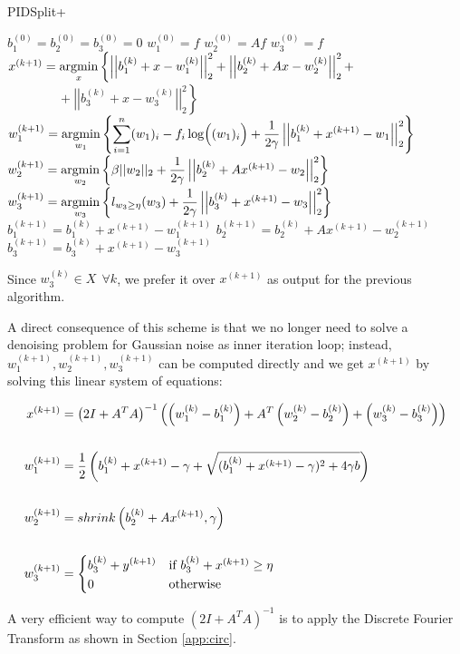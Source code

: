 \begin{algorithm}[H]
\caption{PIDSplit+}
\begin{algorithmic}
\STATE $b_1^{(0)} = b_2^{(0)} = b_3^{(0)} = 0$
\STATE $w_1^{(0)} = f$
\STATE $w_2^{(0)} = Af$
\STATE $w_3^{(0)} = f$
\STATE $x^{(k+1)} = \mathop{\mathrm{argmin}}\limits_x \left\{ \left|\left|b_1^{(k)}+x-w_1^{(k)}\right|\right|_2^2 + \left|\left|b_2^{(k)} + Ax -w_2^{(k)}\right|\right|_2^2 + \right.$
\STATE $\left. \qquad\qquad + \left|\left|b_3^{(k)}+x-w_3^{(k)}\right|\right|_2^2 \right\}$
\STATE
\STATE $w_1^{(k+1)} = \mathop{\mathrm{argmin}}\limits_{w_1} \left\{ \displaystyle \sum_{i=1}^n (w_1)_i - f_i \log\Bigl((w_1)_i\Bigr)+\dfrac{1}{2\gamma} \left|\left|b_1^{(k)} + x^{(k+1)} - w_1 \right|\right|_2^2\right\}$
\STATE
\STATE $w_2^{(k+1)} = \mathop{\mathrm{argmin}}\limits_{w_2} \left\{ \beta ||w_2||_2 + \dfrac{1}{2\gamma}\left|\left|b_2^{(k)}+Ax^{(k+1)} - w_2\right|\right|_2^2 \right\}$
\STATE
\STATE $w_3^{(k+1)} = \mathop{\mathrm{argmin}}\limits_{w_3} \left\{ l_{w_3 \geq \eta} (w_3) + \dfrac{1}{2\gamma}\left|\left|b_3^{(k)} + x^{(k+1)}-w_3\right|\right|_2^2 \right\}$
\STATE
\STATE $b_1^{(k+1)} = b_1^{(k)} + x^{(k+1)} -w_1^{(k+1)}$
\STATE
\STATE $b_2^{(k+1)} = b_2^{(k)} + Ax^{(k+1)} -w_2^{(k+1)}$
\STATE
\STATE $b_3^{(k+1)} = b_3^{(k)} + x^{(k+1)} - w_3^{(k+1)}$
\ENDFOR
\end{algorithmic}
\end{algorithm}

Since $w_3^{(k)} \in X \,\; \forall k$, we prefer it over $x^{(k+1)}$ as output for the previous algorithm.

A direct consequence of this scheme is that we no longer need to solve a denoising problem for Gaussian noise as inner iteration loop; instead, $w_1^{(k+1)}, w_2^{(k+1)},w_3^{(k+1)}$ can be computed directly and we get $x^{(k+1)}$ by solving this linear system of equations:

\begin{align*}
x^{(k+1)} &= \left(2I + A^T A\right)^{-1} \left(\left(w_1^{(k)}-b_1^{(k)}\right) + A^T\left(w_2^{(k)}-b_2^{(k)}\right)+\left(w_3^{(k)}-b_3^{(k)}\right)\right) \\
\\
w_1^{(k+1)} &= \frac{1}{2} \left(b_1^{(k)} + x^{(k+1)} - \gamma + \sqrt{(b_1^{(k)} + x^{(k+1)} - \gamma)^2 + 4\gamma b} \right) \\
\\
w_2^{(k+1)} &= shrink\left(b_2^{(k)} + Ax^{(k+1)},\gamma\right) \\
\\
w_3^{(k+1)} &= \begin{dcases*}
b_3^{(k)} + y^{(k+1)} & if $b_3^{(k)}+x^{(k+1)} \geq \eta$ \\
0 & otherwise
\end{dcases*}
\end{align*}

A very efficient way to compute $\left(2I+A^TA\right)^{-1}$ is to apply the Discrete Fourier Transform as shown in Section \ref{app:circ}. 